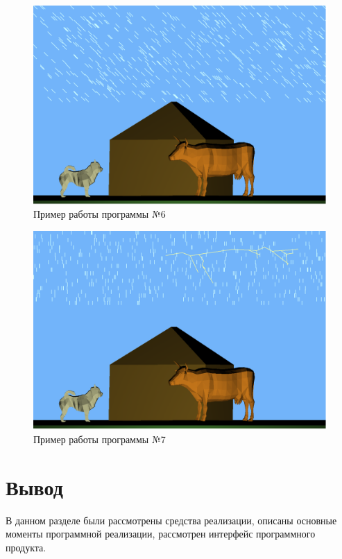 \begin{figure}[H]
	\centering
	\includegraphics[scale=0.2]{include/6.png}
	\caption{Пример работы программы №6}
	\label{img:6}
\end{figure} 

\begin{figure}[H]
	\centering
	\includegraphics[scale=0.2]{include/7.png}
	\caption{Пример работы программы №7}
	\label{img:7}
\end{figure} 


\section{Вывод}

В данном разделе были рассмотрены средства реализации, описаны основные моменты
программной реализации, рассмотрен интерфейс программного продукта.